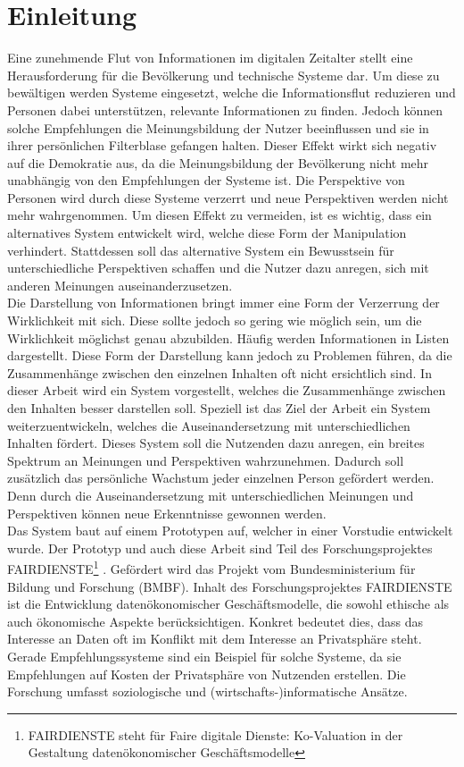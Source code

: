 \section{Einleitung}
Eine zunehmende Flut von Informationen im digitalen Zeitalter stellt eine Herausforderung für die Bevölkerung und technische Systeme dar.
Um diese zu bewältigen werden Systeme eingesetzt, welche die Informationsflut reduzieren und Personen dabei unterstützen, relevante Informationen zu finden.
Jedoch können solche Empfehlungen die Meinungsbildung der Nutzer beeinflussen und sie in ihrer persönlichen Filterblase gefangen halten.
Dieser Effekt wirkt sich negativ auf die Demokratie aus, da die Meinungsbildung der Bevölkerung nicht mehr unabhängig von den Empfehlungen der Systeme ist.
Die Perspektive von Personen wird durch diese Systeme verzerrt und neue Perspektiven werden nicht mehr wahrgenommen.
Um diesen Effekt zu vermeiden, ist es wichtig, dass ein alternatives System entwickelt wird, welche diese Form der Manipulation verhindert.
Stattdessen soll das alternative System ein Bewusstsein für unterschiedliche Perspektiven schaffen und die Nutzer dazu anregen, sich mit anderen Meinungen auseinanderzusetzen. \\

Die Darstellung von Informationen bringt immer eine Form der Verzerrung der Wirklichkeit mit sich.
Diese sollte jedoch so gering wie möglich sein, um die Wirklichkeit möglichst genau abzubilden.
Häufig werden Informationen in Listen dargestellt.
Diese Form der Darstellung kann jedoch zu Problemen führen, da die Zusammenhänge zwischen den einzelnen Inhalten oft nicht ersichtlich sind.
In dieser Arbeit wird ein System vorgestellt, welches die Zusammenhänge zwischen den Inhalten besser darstellen soll.
Speziell ist das Ziel der Arbeit ein System weiterzuentwickeln, welches die Auseinandersetzung mit unterschiedlichen Inhalten fördert.
Dieses System soll die Nutzenden dazu anregen, ein breites Spektrum an Meinungen und Perspektiven wahrzunehmen.
Dadurch soll zusätzlich das persönliche Wachstum jeder einzelnen Person gefördert werden.
Denn durch die Auseinandersetzung mit unterschiedlichen Meinungen und Perspektiven können neue Erkenntnisse gewonnen werden. \\

Das System baut auf einem Prototypen auf, welcher in einer Vorstudie entwickelt wurde.
Der Prototyp und auch diese Arbeit sind Teil des Forschungsprojektes FAIRDIENSTE\footnote{FAIRDIENSTE steht für \glqq Faire digitale Dienste: Ko-Valuation in der Gestaltung datenökonomischer Geschäftsmodelle\grqq{}} \cite{fairdienste}.
Gefördert wird das Projekt vom Bundesministerium für Bildung und Forschung (BMBF).
Inhalt des Forschungsprojektes FAIRDIENSTE ist die Entwicklung datenökonomischer Geschäftsmodelle, die sowohl ethische als auch ökonomische Aspekte berücksichtigen.
Konkret bedeutet dies, dass das Interesse an Daten oft im Konflikt mit dem Interesse an Privatsphäre steht.
Gerade Empfehlungssysteme sind ein Beispiel für solche Systeme, da sie Empfehlungen auf Kosten der Privatsphäre von Nutzenden erstellen.
Die Forschung umfasst soziologische und (wirtschafts-)informatische Ansätze. \\

